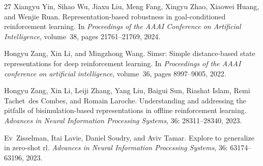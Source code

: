 \documentclass{article}
\begin{document}
\begin{thebibliography}{27}
Xiangyu Yin, Sihao Wu, Jiaxu Liu, Meng Fang, Xingyu Zhao, Xiaowei Huang, and Wenjie Ruan.
\newblock Representation-based robustness in goal-conditioned reinforcement learning.
\newblock In \emph{Proceedings of the AAAI Conference on Artificial Intelligence}, volume~38, pages 21761--21769, 2024.

Hongyu Zang, Xin Li, and Mingzhong Wang.
\newblock Simsr: Simple distance-based state representations for deep reinforcement learning.
\newblock In \emph{Proceedings of the AAAI conference on artificial intelligence}, volume~36, pages 8997--9005, 2022.

Hongyu Zang, Xin Li, Leiji Zhang, Yang Liu, Baigui Sun, Riashat Islam, Remi Tachet~des Combes, and Romain Laroche.
\newblock Understanding and addressing the pitfalls of bisimulation-based representations in offline reinforcement learning.
\newblock \emph{Advances in Neural Information Processing Systems}, 36: 28311--28340, 2023.

Ev~Zisselman, Itai Lavie, Daniel Soudry, and Aviv Tamar.
\newblock Explore to generalize in zero-shot rl.
\newblock \emph{Advances in Neural Information Processing Systems}, 36: 63174--63196, 2023.

\end{thebibliography}
\end{document}
